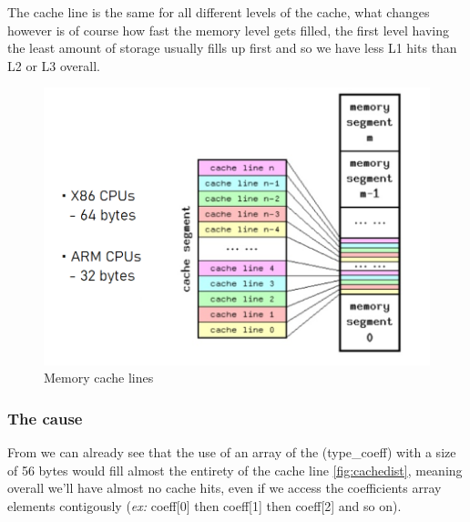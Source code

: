 \documentclass {article}
\begin{document}
The cache line is the same for all different levels of the cache, what changes
however is of course how fast the memory level gets filled, the first level
having the least amount of storage usually fills up first and so we have less
L1 hits than L2 or L3 overall.\\

\begin{figure}[H]
    \includegraphics[width=\linewidth]{plot/cachelines.png}
    \caption{Memory cache lines}
    \label{fig:cachelines}
\end{figure}


\subsubsection{The cause}
From we can already see that the use of an array of the (type\_coeff) with
a size of 56 bytes would fill almost the entirety of the cache line
\ref{fig:cachedist}, meaning overall we'll have almost no cache hits, even if
we access the coefficients array elements contigously (\textit{ex:} coeff[0]
then coeff[1] then coeff[2] and so on).
\end{document}
